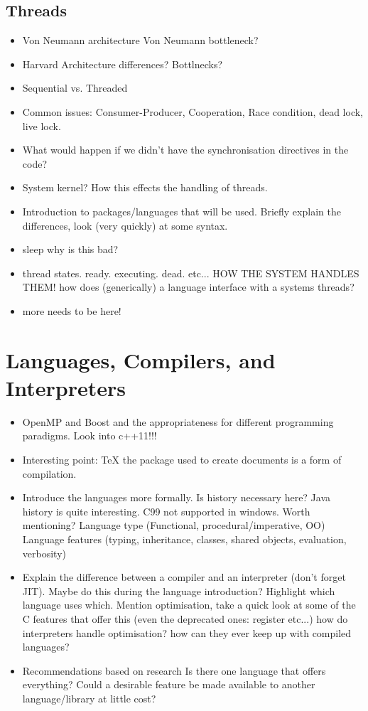 \documentclass[11pt]{article} %
\begin{document}
\subsection{Threads}
\begin{itemize}
\item Von Neumann architecture
\subitem Von Neumann bottleneck?
\item Harvard Architecture
\subitem differences? Bottlnecks?
\item Sequential vs. Threaded
\item Common issues: Consumer-Producer, Cooperation, Race condition, dead lock, live lock.
\item What would happen if we didn't have the synchronisation directives in the code?
\item System kernel? How this effects the handling of threads.
\item Introduction to packages/languages that will be used.
\subitem Briefly explain the differences, look (very quickly) at some syntax.
\item sleep why is this bad?
\item thread states. ready. executing. dead. etc... HOW THE SYSTEM HANDLES THEM!
\subitem how does (generically) a language interface with a systems threads?
\item more needs to be here!
\end{itemize}
\section{Languages, Compilers, and Interpreters}
\begin{itemize}
\item OpenMP and Boost and the appropriateness for different programming paradigms. Look into c++11!!!
\item Interesting point: TeX the package used to create documents is a form of compilation.
\item Introduce the languages more formally.
\subitem Is history necessary here? Java history is quite interesting. 
\subitem C99 not supported in windows. Worth mentioning?
\subitem Language type (Functional, procedural/imperative, OO)
\subitem Language features (typing, inheritance, classes, shared objects, evaluation, verbosity)
\item Explain the difference between a compiler and an interpreter (don't forget JIT). 
\subitem Maybe do this during the language introduction? 
\subitem Highlight which language uses which.
\subitem Mention optimisation, take a quick look at some of the C features that offer this (even the deprecated ones: register etc...)
\subitem how do interpreters handle optimisation?
\subitem how can they ever keep up with compiled languages?
\item Recommendations based on research
\subitem Is there one language that offers everything?
\subitem Could a desirable feature be made available to another language/library at little cost?
\end{itemize}
\end{document}

